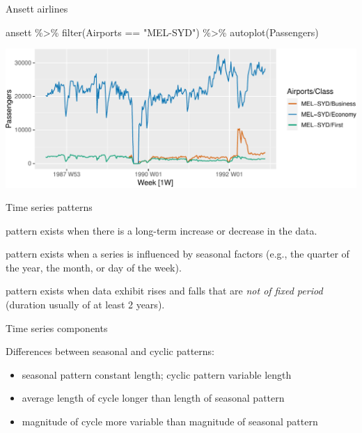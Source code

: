 \documentclass[14pt,ignorenonframetext,aspectratio=169]{beamer}
\newenvironment{Shaded}{\begin{snugshade}}{\end{snugshade}}
\newcommand{\FunctionTok}[1]{\textcolor[rgb]{0.00,0.00,0.00}{#1}}
\newcommand{\NormalTok}[1]{#1}
\newcommand{\SpecialCharTok}[1]{\textcolor[rgb]{0.00,0.00,0.00}{#1}}
\newcommand{\StringTok}[1]{\textcolor[rgb]{0.31,0.60,0.02}{#1}}
\providecommand{\tightlist}{%
  \setlength{\itemsep}{0pt}\setlength{\parskip}{0pt}}
\renewenvironment{Shaded}{\color{black}\begin{snugshade}\color{black}}{\end{snugshade}}
\renewenvironment{Shaded}{\color{black}\fontsize{10}{10}\sf\begin{snugshade}\color{black}}{\end{snugshade}}
\begin{document}
\begin{frame}[fragile]{Ansett airlines}
\protect\hypertarget{ansett-airlines-2}{}
\fontsize{10}{10}\sf

\begin{Shaded}
\begin{Highlighting}[]
\NormalTok{ansett }\SpecialCharTok{\%\textgreater{}\%}
  \FunctionTok{filter}\NormalTok{(Airports }\SpecialCharTok{==} \StringTok{"MEL{-}SYD"}\NormalTok{) }\SpecialCharTok{\%\textgreater{}\%}
  \FunctionTok{autoplot}\NormalTok{(Passengers)}
\end{Highlighting}
\end{Shaded}

\includegraphics{2-tsgraphics_files/figure-beamer/unnamed-chunk-6-1.pdf}
\end{frame}

\begin{frame}{Time series patterns}
\protect\hypertarget{time-series-patterns}{}
\begin{description}
\tightlist
\item[Trend]
pattern exists when there is a long-term increase or decrease in the
data.
\item[Seasonal]
pattern exists when a series is influenced by seasonal factors (e.g.,
the quarter of the year, the month, or day of the week).
\item[Cyclic]
pattern exists when data exhibit rises and falls that are
\emph{not of fixed period} (duration usually of at least 2 years).
\end{description}
\end{frame}

\begin{frame}{Time series components}
\protect\hypertarget{time-series-components}{}
\begin{block}{Differences between seasonal and cyclic patterns:}
\protect\hypertarget{differences-between-seasonal-and-cyclic-patterns}{}
\begin{itemize}
\tightlist
\item
  seasonal pattern constant length; cyclic pattern variable length
\item
  average length of cycle longer than length of seasonal pattern
\item
  magnitude of cycle more variable than magnitude of seasonal pattern
\end{itemize}
\end{block}
\end{frame}
\end{document}
